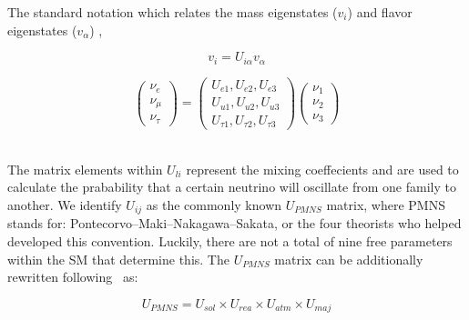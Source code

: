 The standard notation which relates the mass eigenstates ($v_{i}$) and flavor eigenstates ($v_{\alpha}$) ,

\begin{equation}
  v_{i} = U_{i\alpha}v_{\alpha}
\end{equation}
\label{eq:relate_eigenstates}

\begin{equation}
\begin{pmatrix}
\nu_e\\
\nu_{\mu}\\
\nu_{\tau}
\end{pmatrix}
=
\begin{pmatrix}
U_{e1}, U_{e2}, U_{e3} \\
U_{u1}, U_{u2}, U_{u3} \\
U_{\tau1}, U_{\tau2}, U_{\tau3}
\end{pmatrix}
\begin{pmatrix}
\nu_1\\
\nu_2\\
\nu_3
\end{pmatrix}
\end{equation}
~\label{eq:mass_eigenstates}

The matrix elements within $U_{li}$ represent the mixing coeffecients and are used to calculate the prabability that a certain neutrino will oscillate from one family to another.
We identify $U_{ij}$ as the commonly known $U_{PMNS}$ matrix, where PMNS stands for: Pontecorvo–Maki–Nakagawa–Sakata, or the four theorists who helped developed this convention.
Luckily, there are not a total of nine free parameters within the SM that determine this.
The $U_{PMNS}$ matrix can be additionally rewritten following~\citep{Pontecorvo:1957qd, 1962PThPh..28..870M} as:

\begin{equation}
U_{PMNS}
=
U_{sol} \times U_{rea} \times U_{atm} \times U_{maj}
\end{equation}
~\label{eq:uij_matrix_simp}

